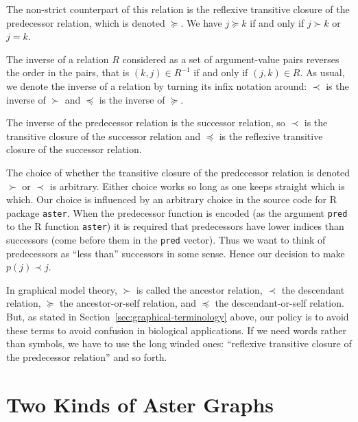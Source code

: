 The non-strict counterpart of this relation
is the reflexive transitive closure of the predecessor relation,
which is denoted $\succeq$.
We have $j \succeq k$ if and only if $j \succ k$ or $j = k$.

The inverse of a relation $R$ considered as a set of argument-value pairs
reverses the order in the pairs, that is $(k, j) \in R^{- 1}$ if and only
if $(j, k) \in R$.
As usual, we denote the inverse of a relation by turning its infix notation
around: $\prec$ is the inverse of $\succ$ and $\preceq$ is the inverse
of $\succeq$.

The inverse of the predecessor relation is the successor relation,
so $\prec$ is the transitive closure of the successor relation
and $\preceq$ is the reflexive transitive closure of the successor relation.

The choice of whether the transitive closure of the predecessor relation
is denoted $\succ$ or $\prec$ is arbitrary.  Either choice works so long
as one keeps straight which is which.  Our choice is influenced by an
arbitrary choice in the source code for R package \texttt{aster}.  When
the predecessor function is encoded (as the argument \texttt{pred} to the
R function \texttt{aster}) it is required that predecessors have lower indices
than successors (come before them in the \texttt{pred} vector).  Thus we
want to think of predecessors as ``less than'' successors in some sense.
Hence our decision to make $p(j) \prec j$.

In graphical model theory,
$\succ$ is called the ancestor relation,
$\prec$ the descendant relation,
$\succeq$ the ancestor-or-self relation, and
$\preceq$ the descendant-or-self relation.
But, as stated in Section~\ref{sec:graphical-terminology} above,
our policy is to avoid these terms
to avoid confusion in biological applications.
If we need words rather than symbols, we have to use the long winded ones:
``reflexive transitive closure of the predecessor relation'' and so forth.

\section{Two Kinds of Aster Graphs}

